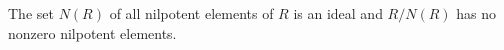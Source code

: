 The set $N(R)$ of all nilpotent elements of $R$ is an ideal
and $R/N(R)$ has no nonzero nilpotent elements.
